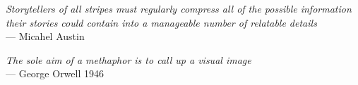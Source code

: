 

    \listoffigures

    \begin{flushright}{\slshape
    Storytellers of all stripes must regularly compress all of the possible information their stories could contain into a manageable number of relatable details } \\ \medskip
    --- Micahel Austin
\end{flushright}

\begin{flushright}{\slshape
    The sole aim of a methaphor is to call up a visual image} \\ \medskip
    --- George Orwell 1946
\end{flushright}

\cleardoublepage

    \listoftables



